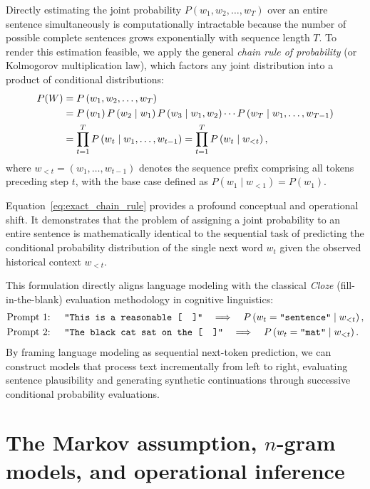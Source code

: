 \documentclass[../../main.tex]{subfiles}
\begin{document}
Directly estimating the joint probability $P(w_1, w_2, \dots, w_T)$ over an entire sentence simultaneously is computationally intractable because the number of possible complete sentences grows exponentially with sequence length $T$. To render this estimation feasible, we apply the general \textit{chain rule of probability} (or Kolmogorov multiplication law), which factors any joint distribution into a product of conditional distributions:
\begin{align}
P(W) &= P\left(w_1, w_2, \dots, w_T\right) \notag \\
&= P\left(w_1\right) P\left(w_2 \mid w_1\right) P\left(w_3 \mid w_1, w_2\right) \cdots P\left(w_T \mid w_1, \dots, w_{T-1}\right) \notag \\
&= \prod_{t=1}^T P\left(w_t \mid w_1, \dots, w_{t-1}\right) = \prod_{t=1}^T P\left(w_t \mid w_{<t}\right),
\label{eq:exact_chain_rule}
\end{align}
where $w_{<t} = (w_1, \dots, w_{t-1})$ denotes the sequence prefix comprising all tokens preceding step $t$, with the base case defined as $P(w_1 \mid w_{<1}) = P(w_1)$.

Equation~\eqref{eq:exact_chain_rule} provides a profound conceptual and operational shift. It demonstrates that the problem of assigning a joint probability to an entire sentence is mathematically identical to the sequential task of predicting the conditional probability distribution of the single next word $w_t$ given the observed historical context $w_{<t}$.

This formulation directly aligns language modeling with the classical \textit{Cloze} (fill-in-the-blank) evaluation methodology in cognitive linguistics:
\begin{align}
\text{Prompt 1: } & \quad \texttt{"This is a reasonable [\quad]"} \quad \Longrightarrow \quad P\left(w_t = \texttt{"sentence"} \mid w_{<t}\right), \\
\text{Prompt 2: } & \quad \texttt{"The black cat sat on the [\quad]"} \quad \Longrightarrow \quad P\left(w_t = \texttt{"mat"} \mid w_{<t}\right).
\end{align}
By framing language modeling as sequential next-token prediction, we can construct models that process text incrementally from left to right, evaluating sentence plausibility and generating synthetic continuations through successive conditional probability evaluations.

\clearpage
\section{The Markov assumption, $n$-gram models, and operational inference}
\label{sec:markov_ngrams_inference}
\end{document}
